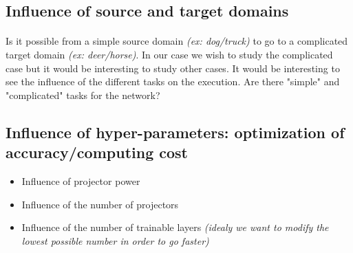 \documentclass[11 pt]{article}
\begin{document}
\subsection{Influence of source and target domains}

\paragraph{}Is it possible from a simple source domain \textit{(ex: dog/truck)} to go to a complicated target domain \textit{(ex: deer/horse)}. In our case we wish to study the complicated case but it would be interesting to study other cases. It would be interesting to see the influence of the different tasks on the execution. Are there "simple" and "complicated" tasks for the network?

\subsection{Influence of hyper-parameters: optimization of accuracy/computing cost}

\begin{itemize}
\item Influence of projector power
\item Influence of the number of projectors
\item Influence of the number of trainable layers \textit{(idealy we want to modify the lowest possible number in order to go faster)}
\end{itemize}
\end{document}
